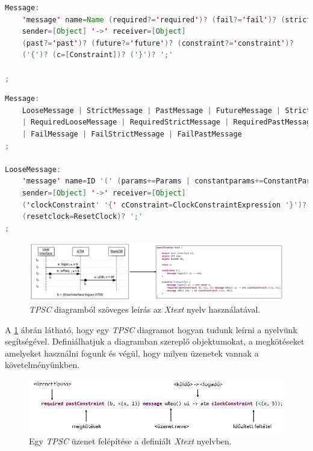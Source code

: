 \begin{lstlisting}[language=java, frame=single, float=ht!, caption={Eredeti \textit{Message} nyelvtani szabály \cite{Bakai}.},captionpos=b,label=minotor_message_original]
Message:
    'message' name=Name (required?='required')? (fail?='fail')? (strict?='strict')?
    sender=[Object] '->' receiver=[Object]
    (past?='past')? (future?='future')? (constraint?='constraint')?
    ('{')? (c=[Constraint])? ('}')? ';'

;
\end{lstlisting}

\begin{lstlisting}[language=java, frame=single, float=ht!, caption={Kibővített \textit{Message} nyelvtani szabály.},captionpos=b,label=minotor_message]
Message:
	LooseMessage | StrictMessage | PastMessage | FutureMessage | StrictFutureMessage
	| RequiredLooseMessage | RequiredStrictMessage | RequiredPastMessage | RequiredFutureMessage | RequiredStrictFutureMessage
	| FailMessage | FailStrictMessage | FailPastMessage
;

LooseMessage:
	'message' name=ID '(' (params+=Params | constantparams+=ConstantParams) ')'
	sender=[Object] '->' receiver=[Object]
	('clockConstraint' '{' cConstraint=ClockConstraintExpression '}')?
	(resetclock=ResetClock)? ';'
;
\end{lstlisting}

\begin{figure}[!ht]
    \centering
    \includegraphics[width=150mm, keepaspectratio]{figures/11abra.png}
    \caption{\textit{TPSC} diagramból szöveges leírás az \textit{Xtext} nyelv használatával.}
    \label{xtext_language_example}
\end{figure}

A \ref{xtext_language_example} ábrán látható, hogy egy \textit{TPSC} diagramot hogyan tudunk leírni a nyelvünk segítségével.
Definiálhatjuk a diagramban szereplő objektumokat, a megkötéseket amelyeket használni fogunk és végül, hogy milyen üzenetek vannak a követelményünkben.

\begin{figure}[!ht]
    \centering
    \includegraphics[width=150mm, keepaspectratio]{figures/12abra.png}
    \caption{Egy \textit{TPSC} üzenet felépítése a definiált \textit{Xtext} nyelvben.}
    \label{xtext_message}
\end{figure}


